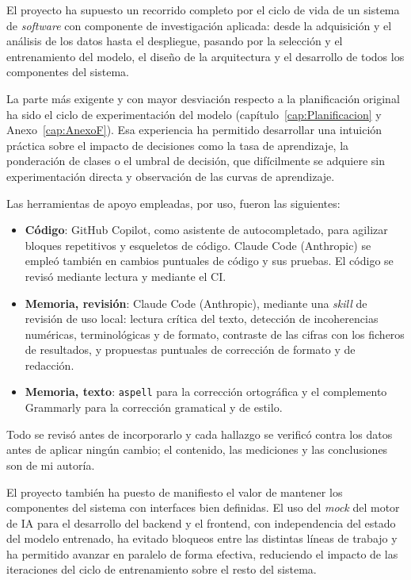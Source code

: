 El proyecto ha supuesto un recorrido completo por el ciclo de vida de un sistema de \emph{software} con componente de investigación aplicada: desde la adquisición y el análisis de los datos hasta el despliegue, pasando por la selección y el entrenamiento del modelo, el diseño de la arquitectura y el desarrollo de todos los componentes del sistema.

La parte más exigente y con mayor desviación respecto a la planificación original ha sido el ciclo de experimentación del modelo (capítulo~\ref{cap:Planificacion} y Anexo~\ref{cap:AnexoF}). Esa experiencia ha permitido desarrollar una intuición práctica sobre el impacto de decisiones como la tasa de aprendizaje, la ponderación de clases o el umbral de decisión, que difícilmente se adquiere sin experimentación directa y observación de las curvas de aprendizaje.

Las herramientas de apoyo empleadas, por uso, fueron las siguientes:
\begin{itemize}
 \item \textbf{Código}: GitHub Copilot, como asistente de autocompletado, para agilizar bloques repetitivos y esqueletos de código. Claude Code (Anthropic) se empleó también en cambios puntuales de código y sus pruebas. El código se revisó mediante lectura y mediante el CI.
 \item \textbf{Memoria, revisión}: Claude Code (Anthropic), mediante una \emph{skill} de revisión de uso local: lectura crítica del texto, detección de incoherencias numéricas, terminológicas y de formato, contraste de las cifras con los ficheros de resultados, y propuestas puntuales de corrección de formato y de redacción.
 \item \textbf{Memoria, texto}: \texttt{aspell} para la corrección ortográfica y el complemento Grammarly para la corrección gramatical y de estilo.
\end{itemize}
Todo se revisó antes de incorporarlo y cada hallazgo se verificó contra los datos antes de aplicar ningún cambio; el contenido, las mediciones y las conclusiones son de mi autoría.

El proyecto también ha puesto de manifiesto el valor de mantener los componentes del sistema con interfaces bien definidas. El uso del \emph{mock} del motor de IA para el desarrollo del backend y el frontend, con independencia del estado del modelo entrenado, ha evitado bloqueos entre las distintas líneas de trabajo y ha permitido avanzar en paralelo de forma efectiva, reduciendo el impacto de las iteraciones del ciclo de entrenamiento sobre el resto del sistema.

